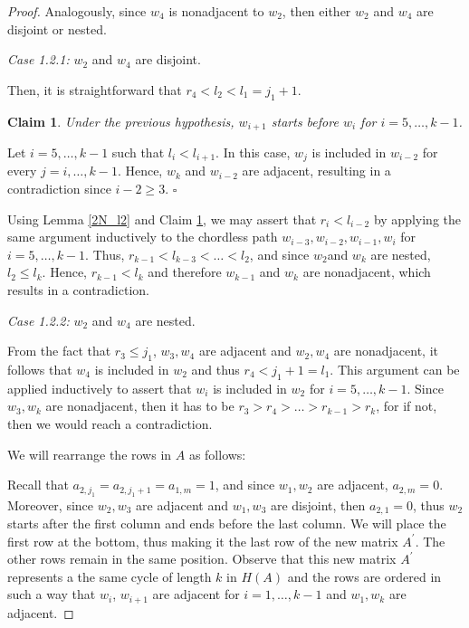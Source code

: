 \documentclass[a4paper,10pt]{report}
\theoremstyle{plain}
\newtheorem{claim}{Claim}[section]
\theoremstyle{remark}
\theoremstyle{plain}
\newcommand*{\QED}{\hfill\ensuremath{\square}}%
\begin{document}
\begin{proof}
	Analogously, since $w_4$ is nonadjacent to $w_2$,
	then either $w_2$ and $w_4$ are disjoint or nested.
	
	\vspace{.5mm}
	\textit{Case 1.2.1:} $w_2$ and $w_4$ are disjoint.
	
	Then, it is straightforward that $r_4 < l_2 < l_1 = j_1 + 1$.
	
	\begin{claim} \label{2N_c4}
		Under the previous hypothesis, $w_{i+1}$ starts before $w_{i}$ for $i =5, \ldots, k-1$. 
	\end{claim}
	
	Let $i=5, \ldots, k-1$ such that $l_i < l_{i+1}$. 
	In this case, $w_j$ is included in $w_{i-2}$ for every $j=i, \ldots, k-1$.
	Hence, $w_k$ and $w_{i-2}$ are adjacent, resulting in a contradiction since $i-2 \geq 3$. \QED
	
	\vspace{1mm}
	
	Using Lemma \ref{2N_l2} and Claim \ref{2N_c4}, we may assert that $r_i < l_{i-2}$ by applying the same argument inductively to the chordless path $w_{i-3}, w_{i-2}, w_{i-1}, w_i$ for $i = 5, \ldots, k-1$.
	Thus, $r_{k-1} < l_{k -3} < \ldots < l_2$, and since $w_2$and $w_k$ are nested, $l_2 \leq l_k$. Hence, $r_{k-1} < l_k$ and therefore $w_{k-1}$ and $w_k$
	are nonadjacent, which results in a contradiction.
	
	\vspace{.5mm}
	\textit{Case 1.2.2:} $w_2$ and $w_4$ are nested.
	
	From the fact that $r_3 \leq j_1$, $w_3, w_4$ are adjacent and $w_2, w_4$ are nonadjacent,
	it follows that $w_4$ is included in $w_2$ and thus $r_4 < j_1 + 1 = l_1$. 
	This argument can be applied inductively to assert that $w_i$ is included in $w_2$ for $i = 5, \ldots, k-1$.
	Since $w_3, w_k$ are nonadjacent, then it has to be $r_3 > r_4 > \ldots > r_{k-1} > r_k$, for if not, then we would reach a contradiction.
	
	We will rearrange the rows in $A$ as follows:
	
	Recall that $a_{2,j_1} = a_{2,j_1 +1} = a_{1, m} = 1$, and since $w_1 , w_2$ are adjacent, $a_{2,m} = 0$. 
	Moreover, since $w_2,w_3$ are adjacent and $w_1,w_3$ are disjoint, then $a_{2,1} = 0$, thus $w_2$ starts after the first column and ends before the last column.
	We will place the first row at the bottom, thus making it the last row of the new matrix $A^{'}$. The other rows remain in the same position. Observe that this new matrix $A^{'}$ represents a the same cycle of length $k$ in $H(A)$ and the rows are ordered in such a way that 
	$w_i$, $w_{i+1}$ are adjacent for $i = 1, \ldots, k-1$ and $w_1, w_k$ are adjacent. 
	

\end{proof}
\end{document}

